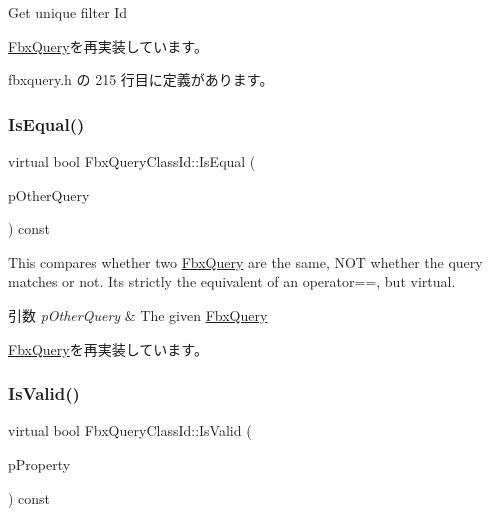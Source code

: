 Get unique filter Id 



\hyperlink{class_fbx_query_ac7daae8f6fa83cd97ae24e93d7b4dc29}{Fbx\+Query}を再実装しています。



 fbxquery.\+h の 215 行目に定義があります。

\mbox{\label{class_fbx_query_class_id_ac20046270f87a7bb84fbf776980431af}} 
\subsubsection{\texorpdfstring{Is\+Equal()}{IsEqual()}}
{\footnotesize\ttfamily virtual bool Fbx\+Query\+Class\+Id\+::\+Is\+Equal (\begin{DoxyParamCaption}\item[{\hyperlink{class_fbx_query}{Fbx\+Query} $\ast$}]{p\+Other\+Query }\end{DoxyParamCaption}) const\hspace{0.3cm}{\ttfamily [virtual]}}

This compares whether two \hyperlink{class_fbx_query}{Fbx\+Query} are the same, N\+OT whether the query matches or not. It\textquotesingle{}s strictly the equivalent of an operator==, but virtual. 
\begin{DoxyParams}{引数}
{\em p\+Other\+Query} & The given \hyperlink{class_fbx_query}{Fbx\+Query} \\
\hline
\end{DoxyParams}


\hyperlink{class_fbx_query_adfc24c7306ceed2fcfd8c67198e0c1dd}{Fbx\+Query}を再実装しています。

\mbox{\label{class_fbx_query_class_id_aaa9990771cab43ddc199eaeac2b6d754}} 
\subsubsection{\texorpdfstring{Is\+Valid()}{IsValid()}}
{\footnotesize\ttfamily virtual bool Fbx\+Query\+Class\+Id\+::\+Is\+Valid (\begin{DoxyParamCaption}\item[{const \hyperlink{class_fbx_property}{Fbx\+Property} \&}]{p\+Property }\end{DoxyParamCaption}) const\hspace{0.3cm}{\ttfamily [virtual]}}

